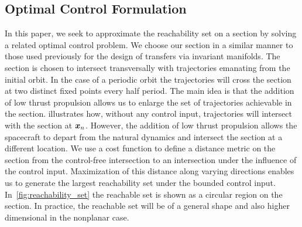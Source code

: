 \documentclass[smallcondensed]{svjour3}
\begin{document}
\subsection{Optimal Control Formulation}\label{sec:optimal_control}
In this paper, we seek to approximate the reachability set on a \Poincare section by solving a related optimal control problem. 
We choose our \Poincare section in a similar manner to those used previously for the design of transfers via invariant manifolds.
The \Poincare section is chosen to intersect transversally with trajectories emanating from the initial orbit. 
In the case of a periodic orbit the trajectories will cross the \Poincare section at two distinct fixed points every half period.
The main idea is that the addition of low thrust propulsion allows us to enlarge the set of trajectories achievable in the \Poincare section. 
 illustrates how, without any control input, trajectories will intersect with the \Poincare section at \( \bm{x}_n \). 
However, the addition of low thrust propulsion allows the spacecraft to depart from the natural dynamics and intersect the \Poincare section at a different location.
We use a cost function to define a distance metric on the \Poincare section from the control-free intersection to an intersection under the influence of the control input.
Maximization of this distance along varying directions enables us to generate the largest reachability set under the bounded control input.
In~\cref{fig:reachability_set} the reachable set is shown as a circular region on the \Poincare section.
In practice, the reachable set will be of a general shape and also higher dimensional in the nonplanar case.
\end{document}
